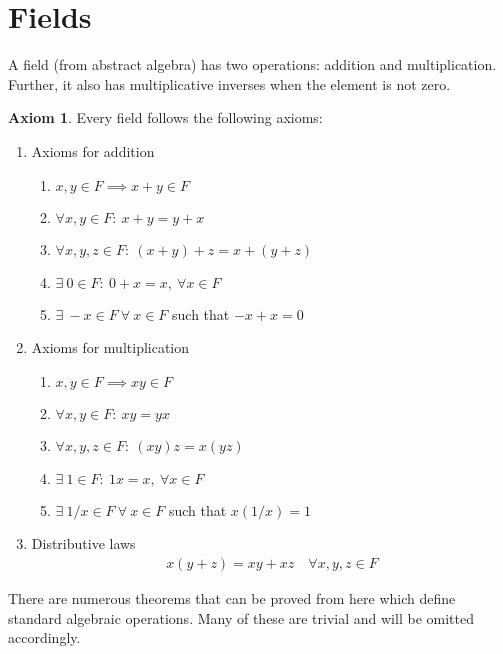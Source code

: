 \documentclass[14pt]{extarticle}
\theoremstyle{definition}
\newtheorem{axiom}{Axiom}[section]
\begin{document}
\pagebreak

\section{Fields}
A field (from abstract algebra) has two operations: addition and multiplication. Further, it also has multiplicative inverses
when the element is not zero.

\begin{axiom}
    Every field follows the following axioms: 
    \begin{enumerate}[label=(\alph*)]
        \item Axioms for addition
            \begin{enumerate}[label=(\arabic*)]
                \item $x, y\in F \implies x + y\in F$ 
                \item $\forall x,y\in F:\ x + y = y + x$
                \item $\forall x,y,z\in F:\ (x + y) + z = x + (y + z)$ 
                \item $\exists\ 0\in F:\ 0 + x = x,\ \forall x\in F$
                \item $\exists\ -x\in F\ \forall\ x\in F$ such that $-x + x = 0$
            \end{enumerate}
        \item Axioms for multiplication
            \begin{enumerate}[label=(\arabic*)]
                \item $x, y\in F \implies xy\in F$ 
                \item $\forall x,y\in F:\ xy = yx$
                \item $\forall x,y,z\in F:\ (xy)z = x(yz)$
                \item $\exists\ 1\in F:\ 1x = x,\ \forall x\in F$
                \item $\exists\ 1/x\in F\ \forall\ x\in F$ such that $x(1/x) = 1$
            \end{enumerate}
        \item Distributive laws
            \begin{align*}
                x(y + z) = xy + xz\quad \forall x,y,z\in F
            \end{align*}
    \end{enumerate}
\end{axiom}

There are numerous theorems that can be proved from here which define standard algebraic operations. Many of these are trivial and
will be omitted accordingly.
\end{document}
